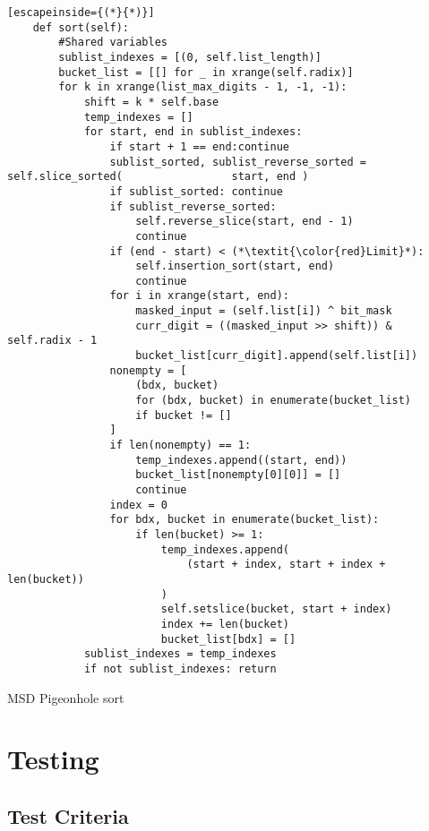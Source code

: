 \documentclass[12pt]{article}
\begin{document}
\begin{table}[H]
	\lstset{
		language=python,
    numbers=left,
    stepnumber=1,
    showstringspaces=false,
    tabsize=3,
    breaklines=true,
    breakatwhitespace=false,}
	\centering
	\begin{lstlisting}[escapeinside={(*}{*)}]
	def sort(self):
		#Shared variables
		sublist_indexes = [(0, self.list_length)]
		bucket_list = [[] for _ in xrange(self.radix)]
		for k in xrange(list_max_digits - 1, -1, -1):
			shift = k * self.base
			temp_indexes = []
			for start, end in sublist_indexes:
				if start + 1 == end:continue
				sublist_sorted, sublist_reverse_sorted = self.slice_sorted(					start, end )
				if sublist_sorted: continue
				if sublist_reverse_sorted:
					self.reverse_slice(start, end - 1)
					continue
				if (end - start) < (*\textit{\color{red}Limit}*):
					self.insertion_sort(start, end)
					continue
				for i in xrange(start, end):
					masked_input = (self.list[i]) ^ bit_mask
					curr_digit = ((masked_input >> shift)) & self.radix - 1
					bucket_list[curr_digit].append(self.list[i])
				nonempty = [
					(bdx, bucket)
					for (bdx, bucket) in enumerate(bucket_list)
					if bucket != []
				]
				if len(nonempty) == 1:
					temp_indexes.append((start, end))
					bucket_list[nonempty[0][0]] = []
					continue
				index = 0
				for bdx, bucket in enumerate(bucket_list):
					if len(bucket) >= 1:
						temp_indexes.append(
							(start + index, start + index + len(bucket))
						)
						self.setslice(bucket, start + index)
						index += len(bucket)
						bucket_list[bdx] = []
			sublist_indexes = temp_indexes
			if not sublist_indexes: return
\end{lstlisting}
\caption*{MSD Pigeonhole sort}
\end{table}
\pagebreak
\section{Testing}
\subsection{Test Criteria}
\end{document}
